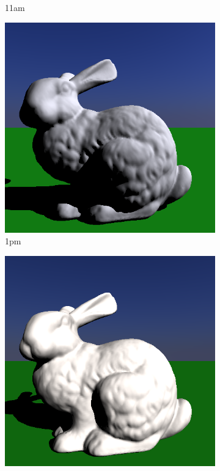 \documentclass[a4paper]{article}
\begin{document}
\begin{figure}[h]
\begin{subfigure}[b]{0.3\textwidth}
		\caption{11am}
		\label{fig:skylight11}
	\end{subfigure}
	\begin{subfigure}[b]{0.3\textwidth}
		\includegraphics[width=\textwidth]{week2/2/bunny_13.png}
		\caption{1pm}
		\label{fig:skylight13}
	\end{subfigure}
	\begin{subfigure}[b]{0.3\textwidth}
		\includegraphics[width=\textwidth]{week2/2/bunny_15.png}

\end{subfigure}
\end{figure}
\end{document}
